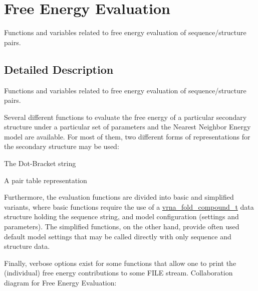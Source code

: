 \hypertarget{group__eval}{}\section{Free Energy Evaluation}
\label{group__eval}


Functions and variables related to free energy evaluation of sequence/structure pairs.  




\subsection{Detailed Description}
Functions and variables related to free energy evaluation of sequence/structure pairs. 

Several different functions to evaluate the free energy of a particular secondary structure under a particular set of parameters and the Nearest Neighbor Energy model are available. For most of them, two different forms of representations for the secondary structure may be used\+:
\begin{DoxyItemize}
\item The Dot-\/\+Bracket string
\item A pair table representation
\end{DoxyItemize}

Furthermore, the evaluation functions are divided into {\ttfamily basic} and {\ttfamily simplified} variants, where {\ttfamily basic} functions require the use of a \mbox{\hyperlink{group__fold__compound_ga1b0cef17fd40466cef5968eaeeff6166}{vrna\+\_\+fold\+\_\+compound\+\_\+t}} data structure holding the sequence string, and model configuration (settings and parameters). The {\ttfamily simplified} functions, on the other hand, provide often used default model settings that may be called directly with only sequence and structure data.

Finally, {\ttfamily verbose} options exist for some functions that allow one to print the (individual) free energy contributions to some {\ttfamily F\+I\+LE} stream. Collaboration diagram for Free Energy Evaluation\+:

